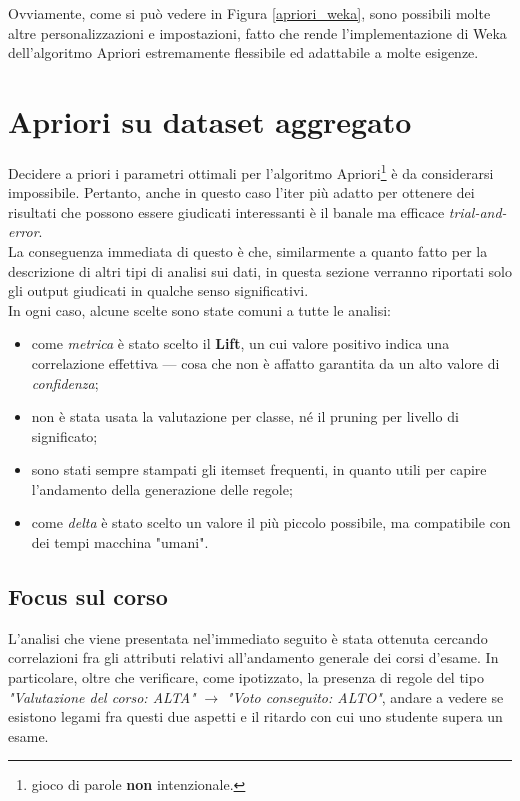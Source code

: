         Ovviamente, come si può vedere in Figura \ref{apriori_weka}, sono possibili molte altre personalizzazioni e impostazioni, fatto che rende l'implementazione di Weka dell'algoritmo Apriori estremamente flessibile ed adattabile a molte esigenze. \\

\section{Apriori su dataset aggregato}

    Decidere a priori i parametri ottimali per l'algoritmo Apriori\footnote{gioco di parole \textbf{non} intenzionale.} è da considerarsi impossibile. Pertanto, anche in questo caso l'iter più adatto per ottenere dei risultati che possono essere giudicati interessanti è il banale ma efficace \textit{trial-and-error}. \\

    La conseguenza immediata di questo è che, similarmente a quanto fatto per la descrizione di altri tipi di analisi sui dati, in questa sezione verranno riportati solo gli output giudicati in qualche senso significativi. \\

    In ogni caso, alcune scelte sono state comuni a tutte le analisi:

    \begin{itemize}
        \item come \textit{metrica} è stato scelto il \textbf{Lift}, un cui valore positivo indica una correlazione effettiva --- cosa che non è affatto garantita da un alto valore di \textit{confidenza};
        \item non è stata usata la valutazione per classe, né il pruning per livello di significato;
        \item sono stati sempre stampati gli itemset frequenti, in quanto utili per capire l'andamento della generazione delle regole;
        \item come \textit{delta} è stato scelto un valore il più piccolo possibile, ma compatibile con dei tempi macchina "umani".
    \end{itemize}

        \subsection{Focus sul corso}

            L'analisi che viene presentata nel'immediato seguito è stata ottenuta cercando correlazioni fra gli attributi relativi all'andamento generale dei corsi d'esame. In particolare, oltre che verificare, come ipotizzato, la presenza di regole del tipo \textit{"Valutazione del corso: ALTA"} $\rightarrow$ \textit{"Voto conseguito: ALTO"}, andare a vedere se esistono legami fra questi due aspetti e il ritardo con cui uno studente supera un esame. \\

